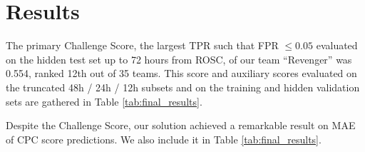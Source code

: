 \section{Results}
\label{sec:results}



% 


The primary Challenge Score, the largest TPR such that FPR $\le 0.05$ evaluated on the hidden test set up to 72 hours from ROSC, of our team ``Revenger'' was 0.554, ranked 12th out of 35 teams. This score and auxiliary scores evaluated on the truncated 48h / 24h / 12h subsets and on the training and hidden validation sets are gathered in Table \ref{tab:final_results}.



 Despite the Challenge Score, our solution achieved a remarkable result on MAE of CPC score predictions. We also include it in Table \ref{tab:final_results}.
